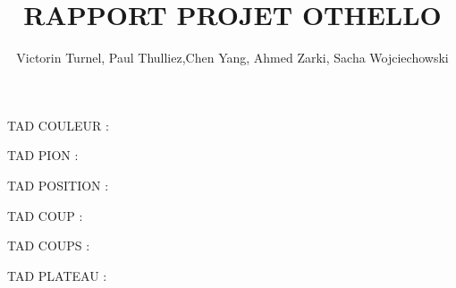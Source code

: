 \documentclass{article}
\title{RAPPORT PROJET OTHELLO}
\author{Victorin Turnel, Paul Thulliez,Chen Yang, Ahmed Zarki, Sacha Wojciechowski}
\begin{document}
\maketitle

TAD COULEUR :



TAD PION :



TAD POSITION :



TAD COUP :



TAD COUPS :



TAD PLATEAU :


\end{document}
